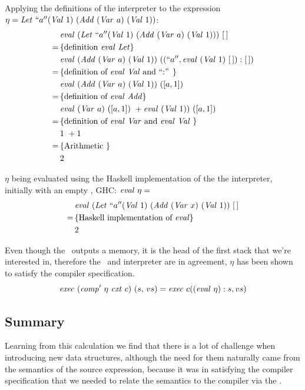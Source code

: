 \documentclass {article}
\begin{document}
Applying the definitions of  the interpreter to the expression
\( \eta = \mathit{Let\ } ``a'' (\mathit{Val\ } 1)\ (\mathit{Add\ } (\mathit{Var\ } a)\ (\mathit{Val\ } 1)) \):
\begin{align*}
&\mathit{eval\ }  (\mathit{Let\ } ``a'' (\mathit{Val\ } 1)\ (\mathit{Add\ } (\mathit{Var\ } a)\ (\mathit{Val\ } 1)))\ [\, ] \\
=\, & \{ \mbox{definition \textit{eval}\ \textit{Let}} \} \\
&\mathit{eval\ }  (\mathit{Add\ } (\mathit{Var\ } a)\ (\mathit{Val\ } 1))\ ((``a'', \mathit{eval\ } (\mathit{Val\ } 1)\ [\, ]):[\, ]) \\
=\, & \{ \mbox{definition of \textit{eval}\ \textit{Val}\ and ``:'' } \} \\
&\mathit{eval\ }  (\mathit{Add\ } (\mathit{Var\ } a)\ (\mathit{Val\ } 1))\ ([a,1]) \\ 
=\, & \{ \mbox{definition of \textit{eval}\ \textit{Add}} \} \\
&\mathit{eval\ } (\mathit{Var\ } a)\ ([a,1])\ + \mathit{eval\ } (\mathit{Val\ } 1))\ ([a,1]) \\
=\, & \{ \mbox{definition of \textit{eval}\ \textit{Var}\ and \textit{eval}\ \textit{Val}\ } \} \\
& 1\ + 1 \\
=\, & \{ \mbox{Arithmetic } \} \\
&2
\end{align*}

$\eta$ being evaluated
using the Haskell implementation of the the interpreter, 
initially with an empty \env,
GHC: \( \mathit{eval\ } \eta = \)
\begin{align*}
&\mathit{eval\ } (\mathit{Let\ } ``a'' (\mathit{Val\ } 1)\ (\mathit{Add\ } (\mathit{Var\ } x)\ (\mathit{Val\ } 1))\ [\, ] \\
=\, & \{ \mbox{Haskell implementation of \textit{eval}} \} \\
&2
\end{align*}

Even though the \vm\ outputs a memory, it is the head of
the first stack that we're interested in,
therefore the \vm\ and interpreter are in agreement, $\eta$
has been shown to satisfy the compiler specification.
\[ \mathit{exec\ } (\mathit{comp'\ } \eta\ \mathit{cxt\ } c)\ (s,\, vs) =
\mathit{exec\ } c ((\mathit{eval\ } \eta ) :s, vs) \]

\subsection{Summary}

Learning from this calculation we find that there is a lot of challenge
when introducing new data structures,
although the need for them naturally came from the semantics of the 
source expression, because it was in satisfying 
the compiler specification that we needed to relate the semantics
to the compiler via the \vm.
\end{document}
